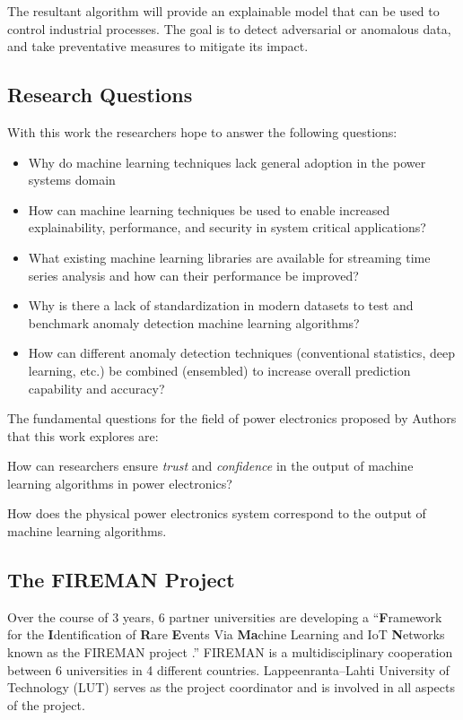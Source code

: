 The resultant algorithm will provide an explainable model that can be used to control industrial processes. The goal is to detect adversarial or anomalous data, and take preventative measures to mitigate its impact.


\subsection{Research Questions}
With this work the researchers hope to answer the following questions:
\begin{itemize}
    \item Why do machine learning techniques lack general adoption in the power systems domain
    \item How can machine learning techniques be used to enable increased explainability, performance, and security in system critical applications?
    \item What existing machine learning libraries are available for streaming time series analysis and how can their performance be improved?
    \item Why is there a lack of standardization in modern datasets to test and benchmark anomaly detection machine learning algorithms?
    \item How can different anomaly detection techniques (conventional statistics, deep learning, etc.) be combined (ensembled) to increase overall prediction capability and accuracy?
\end{itemize}

The fundamental questions for the field of power electronics proposed by Authors \cite{black-box-explainability} that this work explores are:
\begin{inlinelist}
    \item How can researchers ensure \textit{trust} and \textit{confidence} in the output of machine learning algorithms in power electronics?
    \item How does the physical power electronics system correspond to the output of machine learning algorithms.
\end{inlinelist}


\subsection{The FIREMAN Project}

Over the course of 3 years, 6 partner universities are developing a \enquote{\textbf{F}ramework for the \textbf{I}dentification of \textbf{R}are \textbf{E}vents Via \textbf{Ma}chine Learning and IoT \textbf{N}etworks known as the FIREMAN project \parencite{fireman-homepage}.} FIREMAN is a multidisciplinary cooperation between 6 universities in 4 different countries. Lappeenranta--Lahti University of Technology (LUT) serves as the project coordinator and is involved in all aspects of the project.

